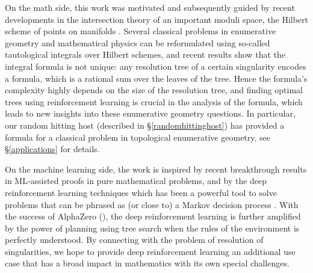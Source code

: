 \documentclass{article}
\theoremstyle{plain}
\theoremstyle{definition}
\theoremstyle{remark}
\begin{document}
On the math side, this work was motivated and subsequently guided by recent developments in the intersection theory of an important moduli space, the Hilbert scheme of points on manifolds \cite{bsz, berczitau}. Several  classical problems in enumerative geometry and mathematical physics can be reformulated using so-called tautological integrals over Hilbert schemes, and recent results show that the integral formula is not unique: any resolution tree of a certain singularity encodes a formula, which is a rational sum over the leaves of the tree. Hence the formula's complexity highly depends on the size of the resolution tree, and finding optimal trees using reinforcement learning is crucial in the analysis of the formula, which leads to new insights into these enumerative geometry questions. In particular, our random hitting host (described in \S \ref{randomhittinghost}) has provided a formula for a classical problem in topological enumerative geometry, see \S \ref{applications} for details.


On the machine learning side, the work is inspired by recent breakthrough results \cite{davies2021} in ML-assisted proofs in pure mathematical problems, and by the deep reinforcement learning techniques which has been a powerful tool to solve problems that can be phrased as (or close to) a Markov decision process \cite{buchberger}. With the success of AlphaZero (\cite{alphazero}), the deep reinforcement learning is further amplified by the power of planning using tree search when the rules of the environment is perfectly understood. By connecting with the problem of resolution of singularities, we hope to provide deep reinforcement learning an additional use case that has a broad impact in mathematics with its own special challenges.
\end{document}
